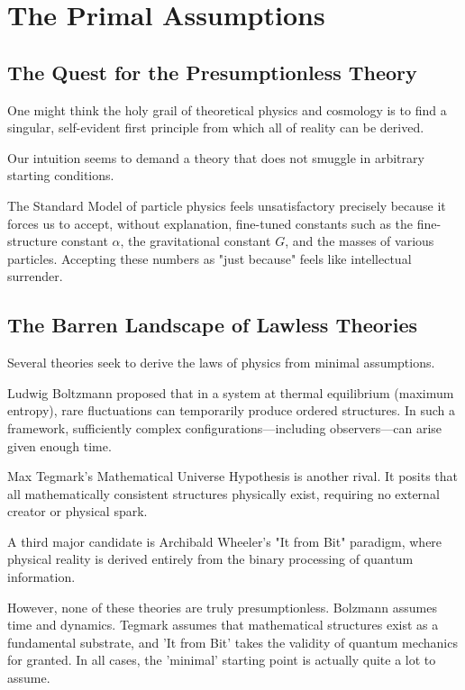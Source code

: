 \chapter{The Primal Assumptions}
\label{chap:primal-assumptions}

\section{The Quest for the Presumptionless Theory}

One might think the holy grail of theoretical physics and cosmology is to find a singular,
self-evident first principle from which all of reality can be derived.

Our intuition seems to demand a theory that does not smuggle in arbitrary starting conditions.

The Standard Model of particle physics feels unsatisfactory precisely because it forces us to accept, without explanation, 
fine-tuned constants such as the fine-structure constant $\alpha$, the gravitational constant $G$, and the masses of various particles.
Accepting these numbers as "just because" feels like intellectual surrender.

\section{The Barren Landscape of Lawless Theories}

Several theories seek to derive the laws of physics from minimal assumptions.

Ludwig Boltzmann proposed that in a system at thermal equilibrium (maximum entropy), rare fluctuations can temporarily produce ordered structures.
In such a framework, sufficiently complex configurations—including observers—can arise given enough time. 

Max Tegmark's Mathematical Universe Hypothesis is another rival.
It posits that all mathematically consistent structures physically exist, requiring no external creator or physical spark.

A third major candidate is Archibald Wheeler's "It from Bit" paradigm, where physical reality is derived entirely from the binary processing of quantum information.

However, none of these theories are truly presumptionless. Bolzmann assumes time and dynamics.
Tegmark assumes that mathematical structures exist as a fundamental substrate, and 'It from Bit' takes the validity of quantum mechanics for granted.
In all cases, the 'minimal' starting point is actually quite a lot to assume.

